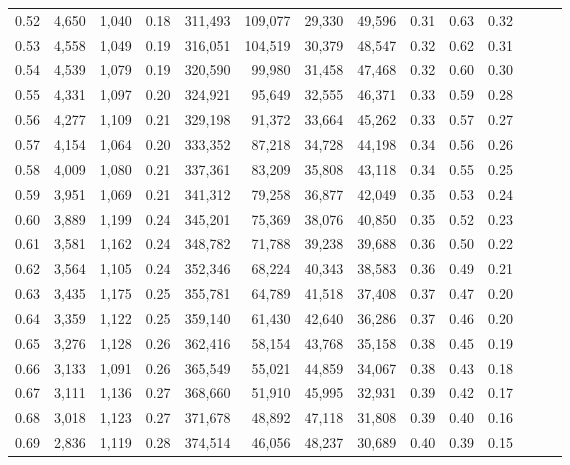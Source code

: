 \begin{tabular}{rrrrrrrrrrrrrr}
0.52 &   4,650 &  1,040 &  0.18 &  311,493 &  109,077 &  29,330 &  49,596 &  0.31 &  0.63 &      0.32 \\
0.53 &   4,558 &  1,049 &  0.19 &  316,051 &  104,519 &  30,379 &  48,547 &  0.32 &  0.62 &      0.31 \\
0.54 &   4,539 &  1,079 &  0.19 &  320,590 &   99,980 &  31,458 &  47,468 &  0.32 &  0.60 &      0.30 \\
0.55 &   4,331 &  1,097 &  0.20 &  324,921 &   95,649 &  32,555 &  46,371 &  0.33 &  0.59 &      0.28 \\
0.56 &   4,277 &  1,109 &  0.21 &  329,198 &   91,372 &  33,664 &  45,262 &  0.33 &  0.57 &      0.27 \\
0.57 &   4,154 &  1,064 &  0.20 &  333,352 &   87,218 &  34,728 &  44,198 &  0.34 &  0.56 &      0.26 \\
0.58 &   4,009 &  1,080 &  0.21 &  337,361 &   83,209 &  35,808 &  43,118 &  0.34 &  0.55 &      0.25 \\
0.59 &   3,951 &  1,069 &  0.21 &  341,312 &   79,258 &  36,877 &  42,049 &  0.35 &  0.53 &      0.24 \\
0.60 &   3,889 &  1,199 &  0.24 &  345,201 &   75,369 &  38,076 &  40,850 &  0.35 &  0.52 &      0.23 \\
0.61 &   3,581 &  1,162 &  0.24 &  348,782 &   71,788 &  39,238 &  39,688 &  0.36 &  0.50 &      0.22 \\
0.62 &   3,564 &  1,105 &  0.24 &  352,346 &   68,224 &  40,343 &  38,583 &  0.36 &  0.49 &      0.21 \\
0.63 &   3,435 &  1,175 &  0.25 &  355,781 &   64,789 &  41,518 &  37,408 &  0.37 &  0.47 &      0.20 \\
0.64 &   3,359 &  1,122 &  0.25 &  359,140 &   61,430 &  42,640 &  36,286 &  0.37 &  0.46 &      0.20 \\
0.65 &   3,276 &  1,128 &  0.26 &  362,416 &   58,154 &  43,768 &  35,158 &  0.38 &  0.45 &      0.19 \\
0.66 &   3,133 &  1,091 &  0.26 &  365,549 &   55,021 &  44,859 &  34,067 &  0.38 &  0.43 &      0.18 \\
0.67 &   3,111 &  1,136 &  0.27 &  368,660 &   51,910 &  45,995 &  32,931 &  0.39 &  0.42 &      0.17 \\
0.68 &   3,018 &  1,123 &  0.27 &  371,678 &   48,892 &  47,118 &  31,808 &  0.39 &  0.40 &      0.16 \\
0.69 &   2,836 &  1,119 &  0.28 &  374,514 &   46,056 &  48,237 &  30,689 &  0.40 &  0.39 &      0.15 \\

\end{tabular}
